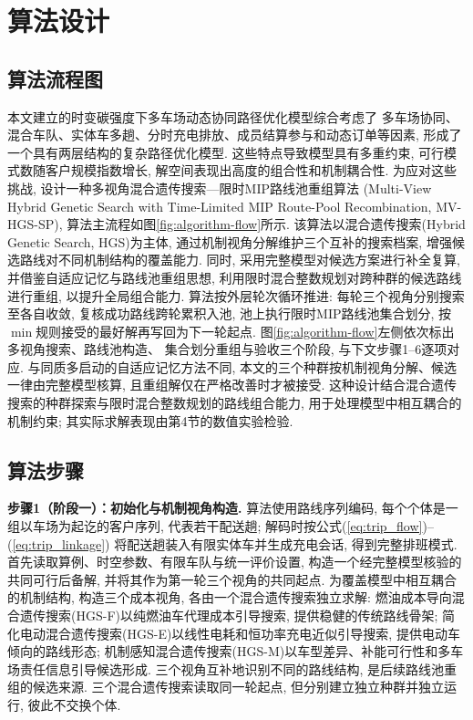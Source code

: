 \documentclass{setp-new}
\begin{document}
\section{算法设计}

\subsection{算法流程图}

本文建立的时变碳强度下多车场动态协同路径优化模型综合考虑了
多车场协同、混合车队、实体车多趟、分时充电排放、成员结算参与和动态订单等因素,
形成了一个具有两层结构的复杂路径优化模型.
这些特点导致模型具有多重约束, 可行模式数随客户规模指数增长,
解空间表现出高度的组合性和机制耦合性.
为应对这些挑战, 设计一种多视角混合遗传搜索—限时MIP路线池重组算法
(Multi-View Hybrid Genetic Search with Time-Limited MIP Route-Pool Recombination, MV-HGS-SP),
算法主流程如图\ref{fig:algorithm-flow}所示.
该算法以混合遗传搜索(Hybrid Genetic Search, HGS)\cite{ref:76,ref:77}为主体,
通过机制视角分解维护三个互补的搜索档案, 增强候选路线对不同机制结构的覆盖能力.
同时, 采用完整模型对候选方案进行补全复算,
并借鉴自适应记忆与路线池重组思想\cite{ref:79,ref:80},
利用限时混合整数规划对跨种群的候选路线进行重组, 以提升全局组合能力.
算法按外层轮次循环推进: 每轮三个视角分别搜索至各自收敛,
复核成功路线跨轮累积入池, 池上执行限时MIP路线池集合划分,
按$\min$规则接受的最好解再写回为下一轮起点.
图\ref{fig:algorithm-flow}左侧依次标出多视角搜索、路线池构造、
集合划分重组与验收三个阶段, 与下文步骤1--6逐项对应.
与同质多启动的自适应记忆方法不同,
本文的三个种群按机制视角分解、候选一律由完整模型核算,
且重组解仅在严格改善时才被接受.
这种设计结合混合遗传搜索的种群探索与限时混合整数规划的路线组合能力,
用于处理模型中相互耦合的机制约束; 其实际求解表现由第4节的数值实验检验.



\subsection{算法步骤}

\textbf{步骤1（阶段一）：初始化与机制视角构造.}
算法使用路线序列编码, 每个个体是一组以车场为起讫的客户序列,
代表若干配送趟; 解码时按公式(\ref{eq:trip_flow})--(\ref{eq:trip_linkage})
将配送趟装入有限实体车并生成充电会话, 得到完整排班模式.
首先读取算例、时空参数、有限车队与统一评价设置, 构造一个经完整模型核验的共同可行后备解,
并将其作为第一轮三个视角的共同起点.
为覆盖模型中相互耦合的机制结构, 构造三个成本视角, 各由一个混合遗传搜索独立求解:
燃油成本导向混合遗传搜索(HGS-F)以纯燃油车代理成本引导搜索, 提供稳健的传统路线骨架;
简化电动混合遗传搜索(HGS-E)以线性电耗和恒功率充电近似引导搜索, 提供电动车倾向的路线形态;
机制感知混合遗传搜索(HGS-M)以车型差异、补能可行性和多车场责任信息引导候选形成.
三个视角互补地识别不同的路线结构, 是后续路线池重组的候选来源.
三个混合遗传搜索读取同一轮起点, 但分别建立独立种群并独立运行, 彼此不交换个体.
\end{document}
